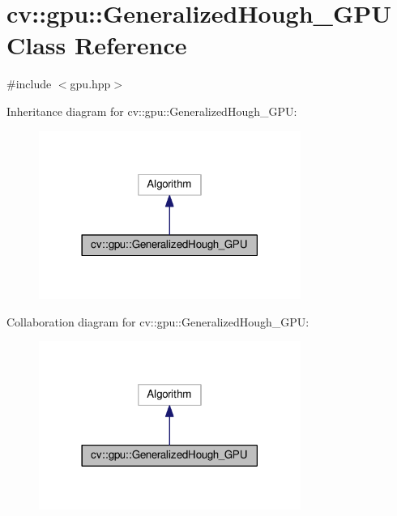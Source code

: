 \hypertarget{classcv_1_1gpu_1_1GeneralizedHough__GPU}{\section{cv\-:\-:gpu\-:\-:Generalized\-Hough\-\_\-\-G\-P\-U Class Reference}
\label{classcv_1_1gpu_1_1GeneralizedHough__GPU}
}


{\ttfamily \#include $<$gpu.\-hpp$>$}



Inheritance diagram for cv\-:\-:gpu\-:\-:Generalized\-Hough\-\_\-\-G\-P\-U\-:\nopagebreak
\begin{figure}[H]
\begin{center}
\leavevmode
\includegraphics[width=242pt]{classcv_1_1gpu_1_1GeneralizedHough__GPU__inherit__graph}
\end{center}
\end{figure}


Collaboration diagram for cv\-:\-:gpu\-:\-:Generalized\-Hough\-\_\-\-G\-P\-U\-:\nopagebreak
\begin{figure}[H]
\begin{center}
\leavevmode
\includegraphics[width=242pt]{classcv_1_1gpu_1_1GeneralizedHough__GPU__coll__graph}
\end{center}
\end{figure}

